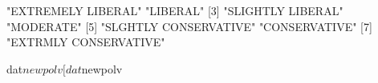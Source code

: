 \begin{Schunk}
\begin{Soutput}
[1] "EXTREMELY LIBERAL"    "LIBERAL"             
[3] "SLIGHTLY LIBERAL"     "MODERATE"            
[5] "SLGHTLY CONSERVATIVE" "CONSERVATIVE"        
[7] "EXTRMLY CONSERVATIVE"
\end{Soutput}
\begin{Sinput}
 dat$newpolv[dat$newpolv %in% levnpv[5:7]] <- levnpv[6]
\end{Sinput}
\end{Schunk}
